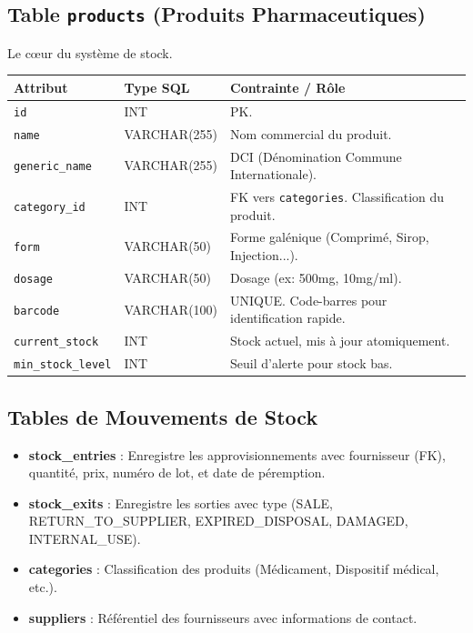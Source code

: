 \documentclass[12pt, a4paper]{report}
\begin{document}
\subsection{Table \texttt{products} (Produits Pharmaceutiques)}
Le cœur du système de stock.
\begin{longtable}{|p{3.5cm}|p{2.5cm}|p{7.5cm}|}
\hline
\textbf{Attribut} & \textbf{Type SQL} & \textbf{Contrainte / Rôle} \\
\hline
\texttt{id} & INT & PK. \\
\hline
\texttt{name} & VARCHAR(255) & Nom commercial du produit. \\
\hline
\texttt{generic\_name} & VARCHAR(255) & DCI (Dénomination Commune Internationale). \\
\hline
\texttt{category\_id} & INT & FK vers \texttt{categories}. Classification du produit. \\
\hline
\texttt{form} & VARCHAR(50) & Forme galénique (Comprimé, Sirop, Injection...). \\
\hline
\texttt{dosage} & VARCHAR(50) & Dosage (ex: 500mg, 10mg/ml). \\
\hline
\texttt{barcode} & VARCHAR(100) & UNIQUE. Code-barres pour identification rapide. \\
\hline
\texttt{current\_stock} & INT & Stock actuel, mis à jour atomiquement. \\
\hline
\texttt{min\_stock\_level} & INT & Seuil d'alerte pour stock bas. \\
\hline
\end{longtable}

\subsection{Tables de Mouvements de Stock}
\begin{itemize}
    \item \textbf{stock\_entries} : Enregistre les approvisionnements avec fournisseur (FK), quantité, prix, numéro de lot, et date de péremption.
    \item \textbf{stock\_exits} : Enregistre les sorties avec type (SALE, RETURN\_TO\_SUPPLIER, EXPIRED\_DISPOSAL, DAMAGED, INTERNAL\_USE).
    \item \textbf{categories} : Classification des produits (Médicament, Dispositif médical, etc.).
    \item \textbf{suppliers} : Référentiel des fournisseurs avec informations de contact.
\end{itemize}
\end{document}
